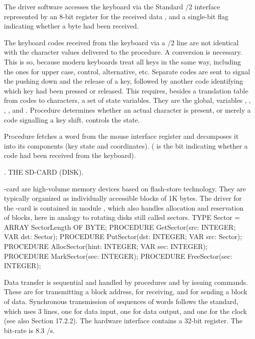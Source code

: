 \noindent The driver software accesses the keyboard via the Standard /2 interface represented by an 8-bit register for the received data , and a single-bit flag indicating whether a byte had been received.

The keyboard codes received from the keyboard via a /2 line are not identical with the character values delivered to the  procedure. A conversion is necessary. This is so, because modern keyboards treat all keys in the same way, including the ones for upper case, control, alternative, etc. Separate codes are sent to signal the pushing down and the release of a key, followed by another code identifying which key had been pressed or released. This requires, besides a translation table from codes to characters, a set of state variables. They are the global,  variables , , , , and . Procedure  determines whether an actual character is present, or merely a code signalling a key shift.  controls the state.

Procedure  fetches a word from the mouse interface register and decomposes it into its components (key state and coordinates). ( is the bit indicating whether a code had been received from the keyboard).


. THE SD-CARD (DISK).

-card are high-volume memory devices based on flash-store technology. They are typically organized as individually accessible blocks of 1K bytes. The driver for the -card is contained in module , which also handles allocation and reservation of blocks, here in analogy to rotating disks still called sectors.
\begintt
TYPE Sector = ARRAY SectorLength OF BYTE;
PROCEDURE GetSector(src: INTEGER; VAR dst: Sector);
PROCEDURE PutSector(dst: INTEGER; VAR src: Sector);
PROCEDURE AllocSector(hint: INTEGER; VAR sec: INTEGER);
PROCEDURE MarkSector(sec: INTEGER);
PROCEDURE FreeSector(sec: INTEGER);
\endtt

\noindent Data transfer is sequential and handled by procedures  and  by issuing commands. These are for transmitting a block address, for receiving, and for sending a block of data. Synchronous transmission of sequences of words follows the  standard, which uses 3 lines, one for data input, one for data output, and one for the clock (see also Section 17.2.2). The hardware interface contains a 32-bit register. The bit-rate is 8.3 /s.

